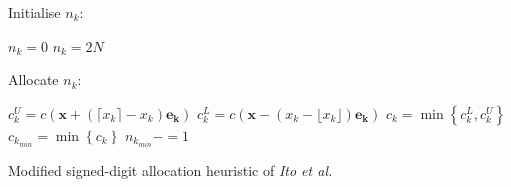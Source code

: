\documentclass[a4paper,twoside,10pt,english]{report}
\begin{document}
\begin{algorithm}[!htbp]
Initialise $n_{k}$:
\begin{algorithmic}
\State $n_{k}=0$
\Else
\State $n_{k}=2N$
\EndIf
\EndFor
\end{algorithmic}
Allocate $n_{k}$:
\begin{algorithmic}
\State $c^{U}_{k}=c\left(\boldsymbol{x}+\left(\lceil{}x_{k}\rceil-x_{k}\right)
                        \boldsymbol{e_{k}}\right)$
\State $c^{L}_{k}=c\left(\boldsymbol{x}-\left(x_{k}-\lfloor{}x_{k}\rfloor\right)
                        \boldsymbol{e_{k}}\right)$
\State $c_{k}=\min\left\{c^{L}_{k},c^{U}_{k}\right\}$
\EndIf
\EndFor
\State $c_{k_{min}}=\min\left\{c_{k}\right\}$
\State $n_{k_{min}}-=1$
\EndFor
\end{algorithmic}
\caption{Modified signed-digit allocation heuristic of 
\emph{Ito et al.}~\cite{Ito_PowersOfTwoAllocationFIR}}
\label{alg:Modified-Ito-signed-digit-allocation}
\end{algorithm}
\end{document}
